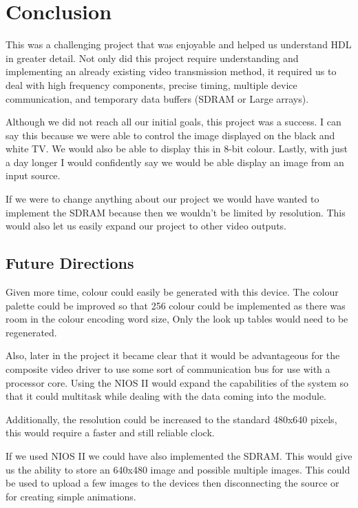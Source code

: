 \section{Conclusion}
This was a challenging project that was enjoyable and helped us understand HDL
in greater detail. Not only did this project require understanding and 
implementing an already existing video transmission method, it required us 
to deal with high frequency components, precise timing, multiple device 
communication, and temporary data buffers (SDRAM or Large arrays).

Although we did not reach all our initial goals, this project was a success. 
I can say this because we were able to control the image displayed on the black
and white TV. We would also be able to display this in 8-bit colour. Lastly, 
with just a day longer I would confidently say we would be able display an 
image from an input source.

If we were to change anything about our project we would have wanted to implement
the SDRAM because then we wouldn't be limited by resolution. This would also
let us easily expand our project to other video outputs.

\newpage

\subsection{Future Directions}

Given more time, colour could easily be generated with this device. The colour
palette could be improved so that 256 colour could be implemented as there was
room in the colour encoding word size, Only the look up tables would need to be
regenerated. 

Also, later in the project it became clear that it would be advantageous for the
composite video driver to use some sort of communication bus for use with a
processor core. Using the NIOS II would expand the capabilities of the system so
that it could multitask while dealing with the data coming into the module.

Additionally, the resolution could be increased to the standard 480x640 pixels,
this would require a faster and still reliable clock.

If we used NIOS II we could have also implemented the SDRAM. This would give us
the ability to store an 640x480 image and possible multiple images. This could 
be used to upload a few images to the devices then disconnecting the source or 
for creating simple animations. 
